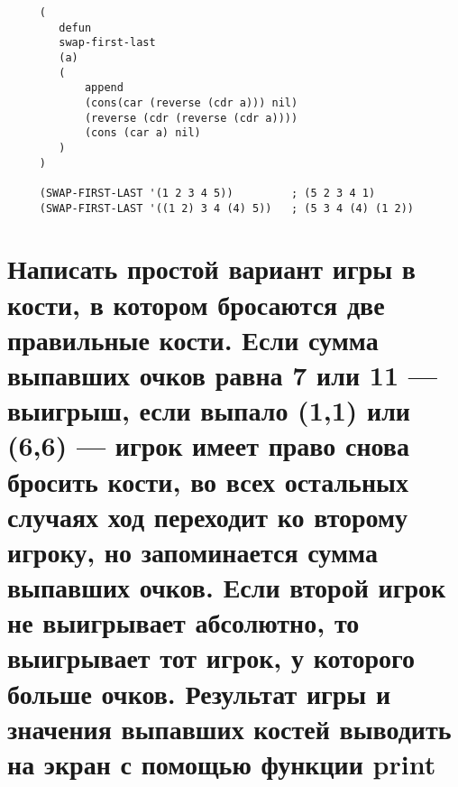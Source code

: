 \begin{lstlisting}
     (
        defun 
        swap-first-last 
        (a) 
        (
            append 
            (cons(car (reverse (cdr a))) nil)
            (reverse (cdr (reverse (cdr a))))
            (cons (car a) nil)
        )
     )

     (SWAP-FIRST-LAST '(1 2 3 4 5))         ; (5 2 3 4 1)
     (SWAP-FIRST-LAST '((1 2) 3 4 (4) 5))   ; (5 3 4 (4) (1 2))
\end{lstlisting}

\section{Написать простой вариант игры в кости, в котором бросаются две
правильные кости. Если сумма выпавших очков равна 7 или 11 —
выигрыш, если выпало (1,1) или (6,6) — игрок имеет право снова
бросить кости, во всех остальных случаях ход переходит ко второму
игроку, но запоминается сумма выпавших очков. Если второй игрок не
выигрывает абсолютно, то выигрывает тот игрок, у которого больше
очков. Результат игры и значения выпавших костей выводить на экран с
помощью функции print}

